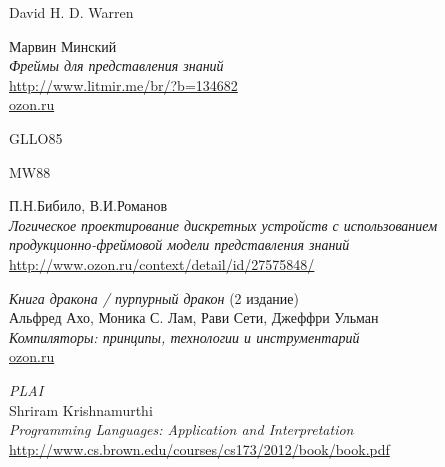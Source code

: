 \begin{thebibliography}{99}

 David H. D. Warren

Марвин Минский\\
\emph{Фреймы для представления знаний}\\
\url{http://www.litmir.me/br/?b=134682}\\ 
\href{http://www.ozon.ru/context/detail/id/31747338/}{ozon.ru}

 GLLO85

 MW88

П.Н.Бибило, В.И.Романов\\
\emph{Логическое проектирование дискретных устройств с использованием
продукционно-фреймовой модели представления знаний}\\
\url{http://www.ozon.ru/context/detail/id/27575848/}

 \textit{Книга дракона / пурпурный дракон} (2 издание)\\
Альфред Ахо, Моника С. Лам, Рави Сети, Джеффри Ульман\\
\emph{Компиляторы: принципы, технологии и инструментарий}\\
\href{https://www.ozon.ru/context/detail/id/3829076/?gclid=Cj0KCQjwzK_bBRDDARIsAFQF7zMjx6XCdudrHmuN0CRn2LL3-mydPE-VSxPZglOVxJl9V7zJ96VzBV4aAsfcEALw_wcB}{ozon.ru}

 \textit{PLAI}\\
Shriram Krishnamurthi\\
\emph{Programming Languages: Application and Interpretation}\\
\url{http://www.cs.brown.edu/courses/cs173/2012/book/book.pdf}

\end{thebibliography}